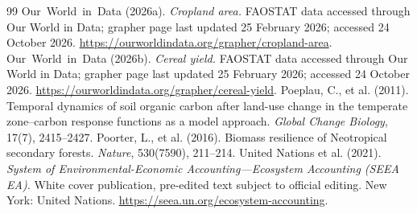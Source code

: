 \documentclass[11pt,a4paper]{article}
\begin{document}
\begin{thebibliography}{99}
 Our~World~in~Data (2026a). \emph{Cropland area.} FAOSTAT data accessed through Our World in Data; grapher page last updated 25 February 2026; accessed 24 October 2026. \url{https://ourworldindata.org/grapher/cropland-area}.
 Our~World~in~Data (2026b). \emph{Cereal yield.} FAOSTAT data accessed through Our World in Data; grapher page last updated 25 February 2026; accessed 24 October 2026. \url{https://ourworldindata.org/grapher/cereal-yield}.
 Poeplau, C., et al. (2011). Temporal dynamics of soil organic carbon after land-use change in the temperate zone--carbon response functions as a model approach. \emph{Global Change Biology}, 17(7), 2415--2427.
 Poorter, L., et al. (2016). Biomass resilience of Neotropical secondary forests. \emph{Nature}, 530(7590), 211--214.
 United Nations et al. (2021). \emph{System of Environmental-Economic Accounting---Ecosystem Accounting (SEEA EA).} White cover publication, pre-edited text subject to official editing. New York: United Nations. \url{https://seea.un.org/ecosystem-accounting}.
\end{thebibliography}
\end{document}

